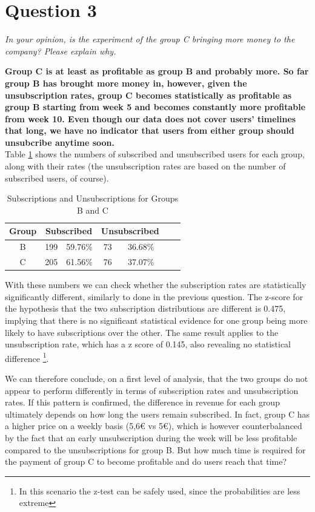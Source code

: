 \documentclass[paper=a4, fontsize=10pt]{report}
\begin{document}
\section*{Question 3}

\textit{In your opinion, is the experiment of the group C bringing more money to the company? Please explain why.}

\textbf{Group C is at least as profitable as group B and probably more. So far group B has brought more money in, however, given the unsubscription rates,
group C becomes statistically as profitable as group B starting from week 5 and becomes constantly more profitable from week 10.
Even though our data does not cover users' timelines that long, we have no indicator that users from either group
should unsubcribe anytime soon.}\\


Table \ref{tab:sub_unsub_rates} shows the numbers of subscribed and unsubscribed users for each group, along with their rates (the unsubscription rates are based on the number of subscribed users, of course).

\begin{table}[htbp]
\normalsize

  \centering
  \caption{Subscriptions and Unsubscriptions for Groups B and C}
    \begin{tabular}{ccccccc}
    \toprule
    \textbf{Group } & \multicolumn{2}{c}{\textbf{Subscribed}} & \multicolumn{2}{c}{\textbf{Unsubscribed}} \\
    \midrule
    B & 199  & 59.76\% & 73  & 36.68\%  \\
    C & 205   & 61.56\% & 76   & 37.07\%  \\
    \bottomrule
    \end{tabular}%
  \label{tab:sub_unsub_rates}%
\end{table}%
\normalsize

With these numbers we can check whether the subscription rates are statistically significantly different, similarly
to done in the previous question. The z-score for the hypothesis that the two subscription distributions are different is 0.475, implying that there is no significant statistical evidence for one group being more likely to have
subscriptions over the other. The same result applies to the unsubscription rate, which has a z score of 0.145, also revealing no statistical difference
\footnote{In this scenario the z-test can be safely used, since the probabilities are less extreme}.

We can therefore conclude, on a first level of analysis, that the two groups do not appear to perform differently in terms of subscription rates and unsubscription rates. If this 
pattern is confirmed, the difference in revenue for each group ultimately depends on how long the users remain subscribed. In fact, group C has a higher
price on a weekly basis (5,6€ vs 5€), which is
however counterbalanced by the fact that an early unsubscription during the week will be less profitable compared to the unsubscriptions for group B. But how much time is required
for the payment of group C to become profitable and do users reach that time?
\end{document}
